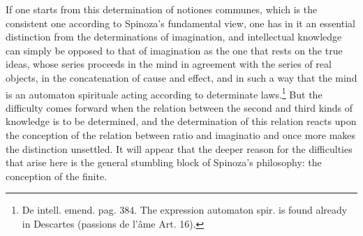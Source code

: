 \documentclass[12pt,a4paper,openany]{book}
\begin{document}
If one starts from this determination of notiones communes, which is the
consistent one according to Spinoza's fundamental view, one has in it an essential
distinction from the determinations of imagination, and intellectual
knowledge can simply be opposed to that of imagination as the one that
rests on the true ideas, whose series proceeds in the mind in
agreement with the series of real objects, in the concatenation of
cause and effect, and in such a way that the mind is an automaton
spirituale acting according to determinate laws.\footnote{De intell. emend. pag.
384. The expression automaton spir. is found already in Descartes
(passions de l'âme Art. 16).} But the difficulty comes forward when
the relation between the second and third kinds of knowledge is to be determined,
and the determination of this relation reacts upon the conception of
the relation between ratio and imaginatio and once more makes the distinction
unsettled. It will appear that the deeper reason for the
difficulties that arise here is the general stumbling block of
Spinoza's philosophy: the conception of the finite.
\end{document}
